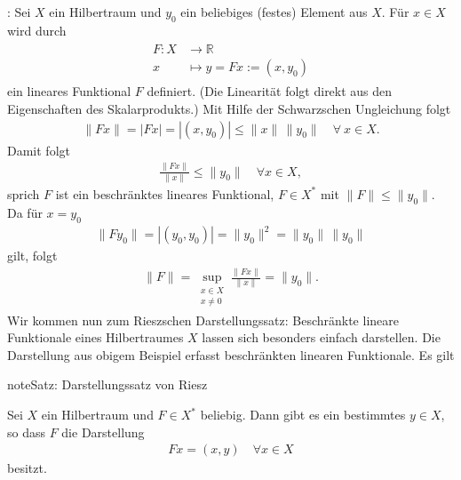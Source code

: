 \documentclass[letterpaper,10pt,english]{jupyterBook}
\begin{document}
: Sei \(X\) ein Hilbertraum und \(y_0\) ein beliebiges (festes) Element aus \(X\). Für \(x\in X\) wird durch
\begin{equation*}
\begin{split}\begin{split}
F : X & \to \mathbb{R}\\
 x & \mapsto y = F x := (x,y_0)\end{split}\end{split}
\end{equation*}
ein lineares Funktional \(F\) definiert. (Die Linearität folgt direkt aus den Eigenschaften des Skalarprodukts.) Mit Hilfe der Schwarzschen Ungleichung folgt
\begin{equation*}
\begin{split}\|F x\| = |F x| = |(x,y_0)| \le \|x\|\,\|y_0\|\quad\forall\ x\in X.\end{split}
\end{equation*}
Damit folgt
\begin{equation*}
\begin{split}\frac{\|F x\|}{\|x\|} \le \|y_0\|\quad \forall x\in X,\end{split}
\end{equation*}
sprich \(F\) ist ein beschränktes lineares Funktional, \(F\in X^*\) mit \(\|F\| \le \|y_0\|\). Da für \(x=y_0\)
\begin{equation*}
\begin{split}\|F y_0\| = |(y_0,y_0)| = \|y_0\|^2 = \|y_0\|\, \|y_0\|\end{split}
\end{equation*}
gilt, folgt
\begin{equation*}
\begin{split}\|F\| = \sup_{\substack{x\in X\\x\not= 0}} \frac{\|F x\|}{\|x\|} = \|y_0\|.\end{split}
\end{equation*}
Wir kommen nun zum Rieszschen Darstellungssatz: Beschränkte lineare Funktionale eines Hilbertraumes \(X\) lassen sich besonders einfach darstellen. Die Darstellung aus obigem Beispiel erfasst  beschränkten linearen Funktionale. Es gilt

\begin{sphinxadmonition}{note}{Satz: Darstellungssatz von Riesz}

Sei \(X\) ein Hilbertraum und \(F\in X^*\) beliebig. Dann gibt es ein  bestimmtes \(y\in X\), so dass \(F\) die Darstellung
\begin{equation*}
\begin{split}F x = (x,y)\quad\forall x\in X\end{split}
\end{equation*}
besitzt.
\end{sphinxadmonition}
\end{document}
